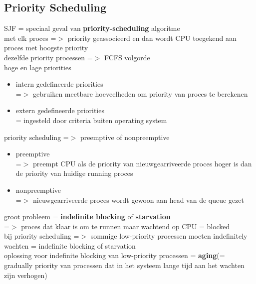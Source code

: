 \documentclass{report}
\begin{document}
\subsection{Priority Scheduling}
SJF = speciaal geval van \textbf{priority-scheduling} algoritme
\\met elk proces =$>$ priority geassocieerd en dan wordt CPU toegekend aan proces met hoogste priority
\\dezelfde priority processen =$>$ FCFS volgorde 
\\hoge en lage priorities
\begin{itemize}
\item intern gedefineerde priorities
\\=$>$ gebruiken meetbare hoeveelheden om priority van proces te berekenen
\item extern gedefineerde priorities
\\ = ingesteld door criteria buiten operating system
\end{itemize}
priority scheduling =$>$ preemptive of nonpreemptive
\begin{itemize}
\item preemptive
\\ =$>$ preempt CPU als de priority van nieuwgearriveerde proces hoger is dan de priority van huidige running proces
\item nonpreemptive
\\ =$>$ nieuwgearriveerde proces wordt gewoon aan head van de queue gezet
\end{itemize}
groot probleem = \textbf{indefinite blocking} of \textbf{starvation} 
\\=$>$ proces dat klaar is om te runnen maar wachtend op CPU = blocked
\\bij priority scheduling =$>$ sommige low-priority processen moeten indefinitely wachten = indefinite blocking of starvation
\\oplossing voor indefinite blocking van low-priority processen = \textbf{aging}(= gradually priority van processen dat in het systeem lange tijd aan het wachten zijn verhogen)
\end{document}
